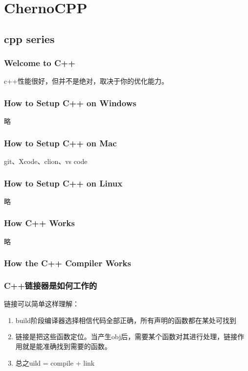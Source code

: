 \section{ChernoCPP}

\subsection{cpp series}
\subsubsection{Welcome to C++}

c++性能很好，但并不是绝对，取决于你的优化能力。

\subsubsection{How to Setup C++ on Windows}

略
\subsubsection{How to Setup C++ on Mac}

git、Xcode、clion、vs code
\subsubsection{How to Setup C++ on Linux}

略
\subsubsection{How C++ Works}

略
\subsubsection{How the C++ Compiler Works}



\subsubsection{C++链接器是如何工作的}

链接可以简单这样理解：

\begin{enumerate} 
	\item build阶段编译器选择相信代码全部正确，所有声明的函数都在某处可找到
	\item 链接是把这些函数定位。当产生obj后，需要某个函数对其进行处理，链接作用就是能准确找到需要的函数。
	\item 总之{\ncodestyle uild = compile + link}
\end{enumerate}

